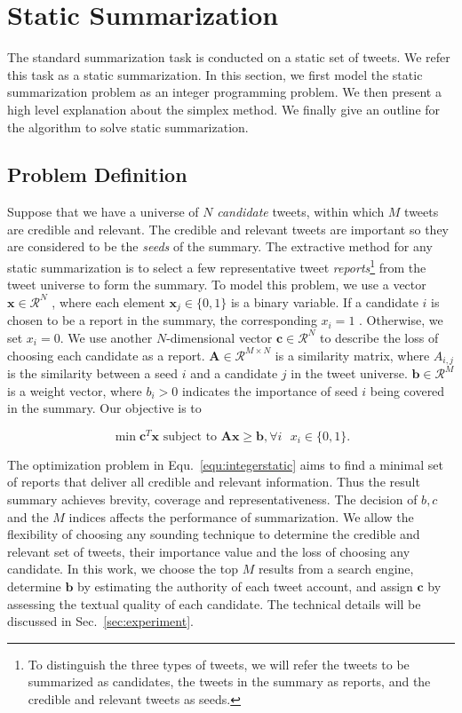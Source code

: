 \documentclass[envcountsame]{llncs}
\begin{document}
\section{Static Summarization}\label{sec:static}
%
The standard summarization task is conducted on a static set of tweets. We refer this task as a static summarization. In this section, we first model the static summarization problem as an integer programming problem. We then present a high level explanation about the simplex method. We finally give an outline for the algorithm to solve static summarization.
\subsection{Problem Definition}
Suppose that we have a universe of $N$ \emph{candidate} tweets, within which $M$ tweets are credible and relevant. The credible and relevant tweets are important so they are considered to be the \emph{seeds} of the summary. The extractive method for any static summarization is to select a few representative tweet \emph{reports}\footnote{To distinguish the three types of tweets, we will refer the tweets to be summarized as candidates, the tweets in the summary as reports, and the credible and relevant tweets as seeds.} from the tweet universe to form the summary. To model this problem, we use a vector $\mathbf{x}\in \mathcal{R}^N$ , where each element $\mathbf{x}_j\in \{0,1\}$ is a binary variable. If a candidate  $i$ is chosen to be a report in the summary, the corresponding $x_i=1$ . Otherwise, we set  $x_i=0$. We use another $N$-dimensional vector $\mathbf{c}\in \mathcal{R}^N$ to describe the loss of choosing each candidate as a report. $\mathbf{A}\in\mathcal{R}^{M\times N}$  is a similarity matrix, where $A_{i,j}$  is the similarity between a seed $i$ and a candidate $j$ in the tweet universe. $\mathbf{b}\in \mathcal{R}^{M}$ is a weight vector, where $b_{i}>0$ indicates the importance of seed $i$ being covered in the summary. Our objective is to

\vspace{-0.3cm}
\begin{equation}\label{equ:integerstatic}
\min \mathbf{c}^T \mathbf{x} \textrm{ subject to } \mathbf{A} \mathbf{x} \geq \mathbf{b}, \forall i\textrm{ } x_i\in \{0,1\}.
\end{equation}
\vspace{-0.6cm}

The optimization problem in Equ.~\ref{equ:integerstatic} aims to find a minimal set of reports that deliver all credible and relevant information. Thus the result summary achieves brevity, coverage and representativeness. The decision of $b,c$ and the $M$ indices affects the performance of summarization. We allow the flexibility of choosing any sounding technique to determine the credible and relevant set of tweets, their importance value and the loss of choosing any candidate. In this work,  we  choose the top $M$ results from a search engine, determine $\mathbf{b}$  by estimating  the authority of each tweet account, and assign $\mathbf{c}$ by assessing the textual quality of each candidate. The technical details will be discussed in Sec.~\ref{sec:experiment}.
\end{document}
